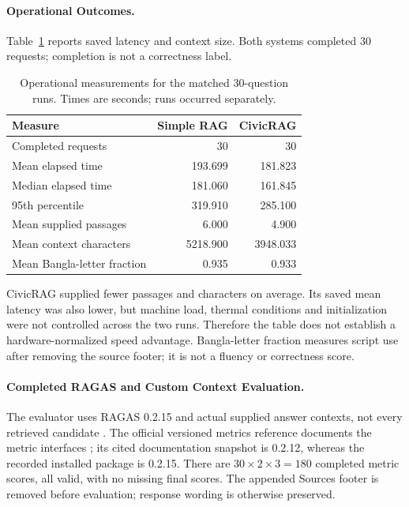 \paragraph{Operational Outcomes.}
Table~\ref{tab:operational-final} reports saved latency and context size. Both systems completed 30 requests; completion is not a correctness label.
\begin{table}[htbp]\centering\small
\caption{Operational measurements for the matched 30-question runs. Times are seconds; runs occurred separately.}\label{tab:operational-final}
\begin{tabularx}{\linewidth}{Xrr}\toprule
Measure & Simple RAG & CivicRAG\\\midrule
Completed requests & 30 & 30\\
Mean elapsed time & 193.699 & 181.823\\
Median elapsed time & 181.060 & 161.845\\
95th percentile & 319.910 & 285.100\\
Mean supplied passages & 6.000 & 4.900\\
Mean context characters & 5218.900 & 3948.033\\
Mean Bangla-letter fraction & 0.935 & 0.933\\\bottomrule
\end{tabularx}\end{table}
CivicRAG supplied fewer passages and characters on average. Its saved mean latency was also lower, but machine load, thermal conditions and initialization were not controlled across the two runs. Therefore the table does not establish a hardware-normalized speed advantage. Bangla-letter fraction measures script use after removing the source footer; it is not a fluency or correctness score.

\paragraph{Completed RAGAS and Custom Context Evaluation.}
The evaluator uses RAGAS 0.2.15 and actual supplied answer contexts, not every retrieved candidate \cite{ragas}. The official versioned metrics reference documents the metric interfaces \cite{ragas_docs}; its cited documentation snapshot is 0.2.12, whereas the recorded installed package is 0.2.15. There are $30\times2\times3=180$ completed metric scores, all valid, with no missing final scores. The appended Sources footer is removed before evaluation; response wording is otherwise preserved.

